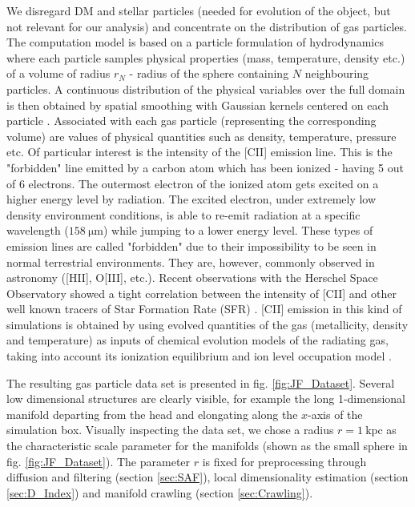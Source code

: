 We disregard DM and stellar particles (needed for evolution of the object, but not relevant for our analysis) and concentrate on the distribution of gas particles. The computation model is based on a particle formulation of hydrodynamics where each particle samples physical properties (mass, temperature, density etc.) of a volume of radius $r_N$ - radius of the sphere containing $N$ neighbouring particles. A continuous distribution of the physical variables over the full domain is then obtained by spatial smoothing with Gaussian kernels centered on each particle \cite{1977MNRAS.181..375G}. Associated with each gas particle (representing the corresponding volume) are values of  physical quantities such as density, temperature, pressure etc. Of particular interest is the intensity of the [CII] emission line. This is the "forbidden" line emitted by a carbon atom which has been ionized - having 5 out of 6 electrons. The outermost electron of the ionized atom gets excited on a higher energy level by radiation. The excited electron, under extremely low density environment conditions, is able to re-emit radiation at a specific wavelength ($158 ~ \mathrm{\mu m}$) while jumping to a lower energy level. These types of emission lines are called "forbidden" due to their impossibility to be seen in normal terrestrial environments.
They are, however, commonly observed in astronomy ([HII], O[III], etc.). Recent observations with the Herschel Space Observatory showed a tight correlation between the intensity of [CII] and other well known tracers of Star Formation Rate (SFR) \cite{DeLooze2011,Herrera_Camus_2015}. [CII] emission in this kind of simulations is obtained by using evolved quantities of the gas (metallicity, density and temperature) as inputs of chemical evolution models of the radiating gas, taking into account its ionization equilibrium and ion level occupation model \cite{Maio2007, DeRijcke2013}.

The resulting gas particle data set is presented in fig. \ref{fig:JF_Dataset}. Several low dimensional structures are clearly visible, for example the long 1-dimensional manifold departing from the head and elongating along the $x$-axis of the simulation box.
Visually inspecting the data set, we chose a radius $r = 1 ~ \mathrm{kpc}$ as the characteristic scale parameter for the manifolds (shown as the small sphere in fig. \ref{fig:JF_Dataset}).
The parameter $r$ is fixed for preprocessing through diffusion and filtering (section \ref{sec:SAF}), local dimensionality estimation (section \ref{sec:D_Index}) and manifold crawling (section \ref{sec:Crawling}).

